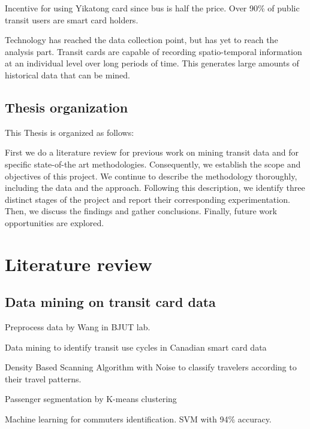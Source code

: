 \documentclass{article}
\begin{document}
Incentive for using Yikatong card since bus is half the price. Over 90\% of public transit users are smart card holders. \cite{ma2017understanding}

Technology has reached the data collection point, but has yet to reach the analysis part. Transit cards are capable of recording spatio-temporal information at an individual level over long periods of time. This generates large amounts of historical data that can be mined.

\subsection{Thesis organization}
This Thesis is organized as follows:

First we do a literature review for previous work on mining transit data and for specific state-of-the art methodologies. Consequently, we establish the scope and objectives of this project. We continue to describe the methodology thoroughly, including the data and the approach. Following this description, we identify three distinct stages of the project and report their corresponding experimentation. Then, we discuss the findings and gather conclusions. Finally, future work opportunities are explored. 


\newpage
\section{Literature review}

\subsection{Data mining on transit card data}
Preprocess data by Wang in BJUT lab. \cite{wang2014research}

Data mining to identify transit use cycles in Canadian smart card data \cite{morency2007measuring}

Density Based Scanning Algorithm with Noise to classify travelers according to their travel patterns.  \cite{ma2013mining}

Passenger segmentation by K-means clustering \cite{bhaskar2015passenger}

Machine learning for commuters identification. SVM with 94\% accuracy. \cite{tu2016impact}
\end{document}
